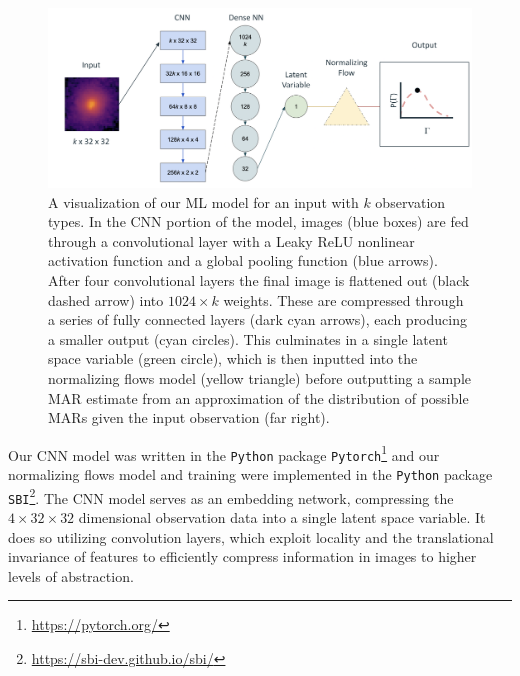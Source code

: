\begin{figure}
    \centering
    \includegraphics[width=\textwidth]{Ch4_MAH_Est/model_diagram_2.png}
    \caption{
    A visualization of our ML model for an input with $k$ observation types. In the CNN portion of the model, images (blue boxes) are fed through a convolutional layer with a Leaky ReLU nonlinear activation function and a global pooling function (blue arrows). After four convolutional layers the final image is flattened out (black dashed arrow) into $1024 \times k$ weights. These are compressed through a series of fully connected layers (dark cyan arrows), each producing a smaller output (cyan circles). This culminates in a single latent space variable (green circle), which is then inputted into the normalizing flows model (yellow triangle) before outputting a sample MAR estimate from an approximation of the distribution of possible MARs given the input observation (far right).}
    \label{fig:model_diagram}
\end{figure}

Our CNN model was written in the \texttt{Python} package \texttt{Pytorch}\footnote{\url{https://pytorch.org/}} and our normalizing flows model and training were implemented in the \texttt{Python} package \texttt{SBI}\footnote{\url{https://sbi-dev.github.io/sbi/}}. The CNN model serves as an embedding network, compressing the $4\times32\times32$ dimensional observation data into a single latent space variable. It does so utilizing convolution layers, which exploit locality and the translational invariance of features to efficiently compress information in images to higher levels of abstraction. 

